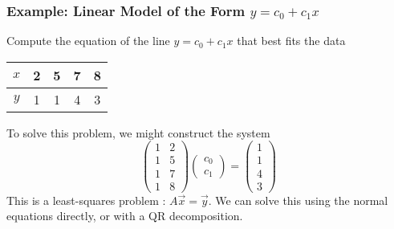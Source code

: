  
\begin{frame}
\frametitle{Example: Linear Model of the Form $y = c_0 + c_1x$}

    Compute the equation of the line $ y= c_0 + c_1 x$ that best fits the data 
    
    \begin{center}
    \begin{tabular}{c|cccc} 
    $ x$ & 2 & 5 & 7 & 8 
    \\ \hline 
    $ y$ & 1 & 1 & 4 & 3 
    \end{tabular}
    \end{center}
    
    
    \pause
    To solve this problem, we might construct the system
    \begin{equation*}
    \begin{pmatrix}
    1 & 2 \\ 1 & 5 \\ 1 & 7 \\ 1 & 8 
    \end{pmatrix} \begin{pmatrix}
    c _0 \\ c _1 
    \end{pmatrix} = \begin{pmatrix}
    1 \\ 1 \\ 4 \\ 3 
    \end{pmatrix}
    \end{equation*}
    This is a least-squares problem :   $ A \vec x = \vec y$. We can solve this using the normal equations directly, or with a QR decomposition. 
    
\end{frame}
 
 
 




